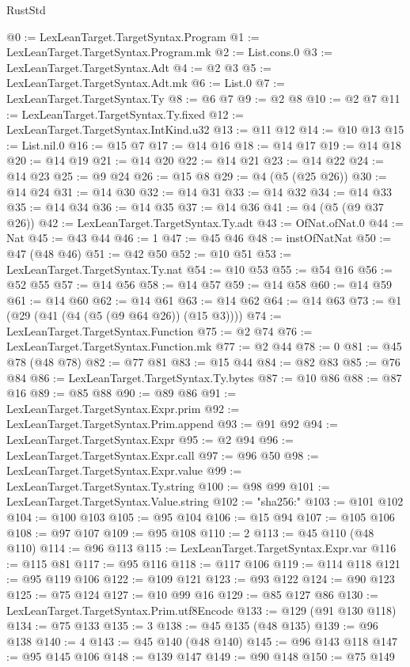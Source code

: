 \begin{lexlean}{RustStd}
\begin{coremodule}
{\begin{coremodule}
{{{{{{{{{{{{{{{{{{{{{{{{{{{{{{{{{{{{{{{@0 := LexLeanTarget.TargetSyntax.Program
@1 := LexLeanTarget.TargetSyntax.Program.mk
@2 := List.cons.{0}
@3 := LexLeanTarget.TargetSyntax.Adt
@4 := @2 @3
@5 := LexLeanTarget.TargetSyntax.Adt.mk
@6 := List.{0}
@7 := LexLeanTarget.TargetSyntax.Ty
@8 := @6 @7
@9 := @2 @8
@10 := @2 @7
@11 := LexLeanTarget.TargetSyntax.Ty.fixed
@12 := LexLeanTarget.TargetSyntax.IntKind.u32
@13 := @11 @12
@14 := @10 @13
@15 := List.nil.{0}
@16 := @15 @7
@17 := @14 @16
@18 := @14 @17
@19 := @14 @18
@20 := @14 @19
@21 := @14 @20
@22 := @14 @21
@23 := @14 @22
@24 := @14 @23
@25 := @9 @24
@26 := @15 @8
@29 := @4 (@5 (@25 @26))
@30 := @14 @24
@31 := @14 @30
@32 := @14 @31
@33 := @14 @32
@34 := @14 @33
@35 := @14 @34
@36 := @14 @35
@37 := @14 @36
@41 := @4 (@5 (@9 @37 @26))
@42 := LexLeanTarget.TargetSyntax.Ty.adt
@43 := OfNat.ofNat.{0}
@44 := Nat
@45 := @43 @44
@46 := 1
@47 := @45 @46
@48 := instOfNatNat
@50 := @47 (@48 @46)
@51 := @42 @50
@52 := @10 @51
@53 := LexLeanTarget.TargetSyntax.Ty.nat
@54 := @10 @53
@55 := @54 @16
@56 := @52 @55
@57 := @14 @56
@58 := @14 @57
@59 := @14 @58
@60 := @14 @59
@61 := @14 @60
@62 := @14 @61
@63 := @14 @62
@64 := @14 @63
@73 := @1 (@29 (@41 (@4 (@5 (@9 @64 @26)) (@15 @3))))
@74 := LexLeanTarget.TargetSyntax.Function
@75 := @2 @74
@76 := LexLeanTarget.TargetSyntax.Function.mk
@77 := @2 @44
@78 := 0
@81 := @45 @78 (@48 @78)
@82 := @77 @81
@83 := @15 @44
@84 := @82 @83
@85 := @76 @84
@86 := LexLeanTarget.TargetSyntax.Ty.bytes
@87 := @10 @86
@88 := @87 @16
@89 := @85 @88
@90 := @89 @86
@91 := LexLeanTarget.TargetSyntax.Expr.prim
@92 := LexLeanTarget.TargetSyntax.Prim.append
@93 := @91 @92
@94 := LexLeanTarget.TargetSyntax.Expr
@95 := @2 @94
@96 := LexLeanTarget.TargetSyntax.Expr.call
@97 := @96 @50
@98 := LexLeanTarget.TargetSyntax.Expr.value
@99 := LexLeanTarget.TargetSyntax.Ty.string
@100 := @98 @99
@101 := LexLeanTarget.TargetSyntax.Value.string
@102 := "sha256:"
@103 := @101 @102
@104 := @100 @103
@105 := @95 @104
@106 := @15 @94
@107 := @105 @106
@108 := @97 @107
@109 := @95 @108
@110 := 2
@113 := @45 @110 (@48 @110)
@114 := @96 @113
@115 := LexLeanTarget.TargetSyntax.Expr.var
@116 := @115 @81
@117 := @95 @116
@118 := @117 @106
@119 := @114 @118
@121 := @95 @119 @106
@122 := @109 @121
@123 := @93 @122
@124 := @90 @123
@125 := @75 @124
@127 := @10 @99 @16
@129 := @85 @127 @86
@130 := LexLeanTarget.TargetSyntax.Prim.utf8Encode
@133 := @129 (@91 @130 @118)
@134 := @75 @133
@135 := 3
@138 := @45 @135 (@48 @135)
@139 := @96 @138
@140 := 4
@143 := @45 @140 (@48 @140)
@145 := @96 @143 @118
@147 := @95 @145 @106
@148 := @139 @147
@149 := @90 @148
@150 := @75 @149
}}}}}}}}}}}}}}}}}}}}}}}}}}}}}}}}}}}}}}}
\end{coremodule}}
\end{coremodule}
\end{lexlean}
